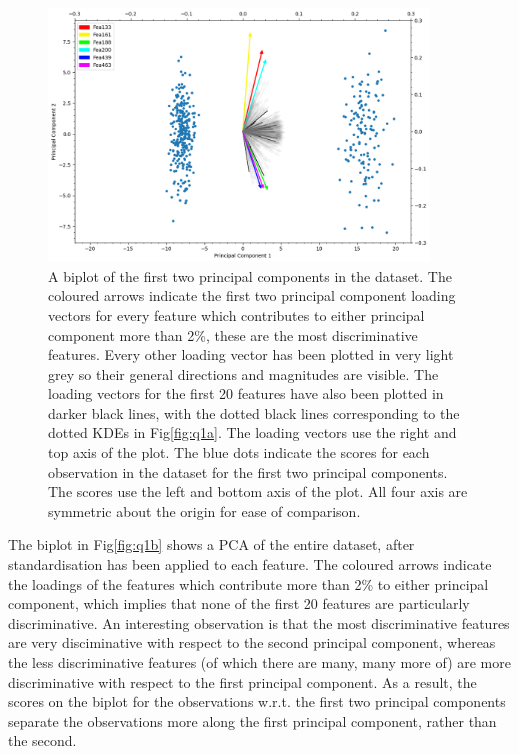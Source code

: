     \begin{figure}[htb]
    \centering
    \includegraphics[width=0.9\textwidth]{./figures/q1b}
    \caption{A biplot of the first two principal components in the  dataset.
        The coloured arrows indicate the first two principal component loading vectors for every feature which contributes to
        either principal component more than 2\%, these are the most discriminative features.
        Every other loading vector has been plotted in very light grey so their general directions and magnitudes are
        visible.
        The loading vectors for the first 20 features have also been plotted in darker black lines, with the dotted
        black lines corresponding to the dotted KDEs in Fig\eqref{fig:q1a}.
        The loading vectors use the right and top axis of the plot.
        The blue dots indicate the scores for each observation in the dataset for the first two principal components.
        The scores use the left and bottom axis of the plot.
        All four axis are symmetric about the origin for ease of comparison.}
    \label{fig:q1b}
    \end{figure}

    The biplot in Fig\eqref{fig:q1b} shows a PCA of the entire dataset, after standardisation has been applied to each
    feature.
    The coloured arrows indicate the loadings of the features which contribute more than 2\% to either principal
    component, which implies that none of the first 20 features are particularly discriminative.
    An interesting observation is that the most discriminative features are very disciminative with respect to the
    second principal component, whereas the less discriminative features (of which there are many, many more of) are
    more discriminative with respect to the first principal component.
    As a result, the scores on the biplot for the observations w.r.t. the first two principal components separate the
    observations more along the first principal component, rather than the second.

